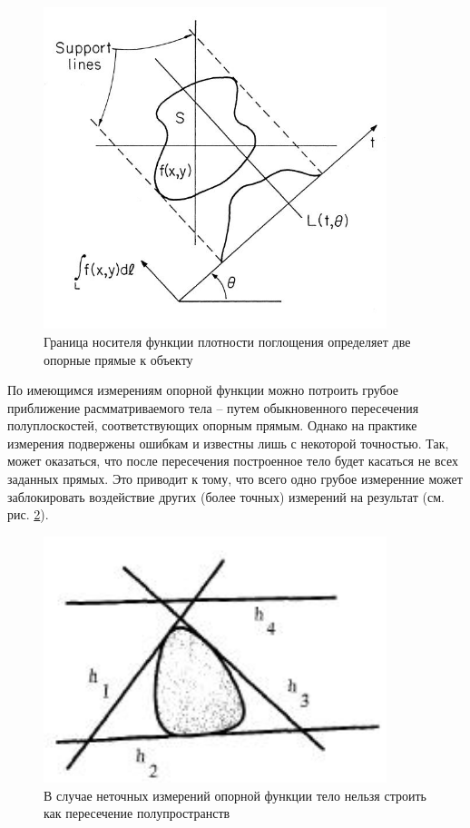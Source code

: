 \documentclass[a4paper,12pt, titlepage]{article}
\begin{document}
\begin{figure}[ht]
    \includegraphics[width=10cm]{images/tomography-application.jpg}
    \caption{Граница носителя функции плотности поглощения определяет две
    опорные прямые к объекту}
    \label{tomography-application}
\end{figure}

По имеющимся измерениям опорной функции можно потроить грубое приближение
расмматриваемого тела -- путем обыкновенного пересечения полуплоскостей,
соответствующих опорным прямым. Однако на практике измерения подвержены
ошибкам и известны лишь с некоторой точностью. Так, может оказаться, что
после пересечения построенное тело будет касаться не всех заданных прямых.
Это приводит к тому, что всего одно грубое измеренние может заблокировать
воздействие других (более точных) измерений на результат (см. рис.
\ref{inconsistent}).

\begin{figure}[ht]
    \includegraphics[width=10cm]{images/inconsistent-support-planes.jpg}
    \caption{В случае неточных измерений опорной функции тело нельзя строить
    как пересечение полупространств}
    \label{inconsistent}
\end{figure}
\end{document}

